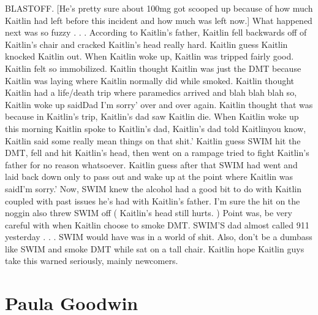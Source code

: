 \documentclass[12pt]{book}
\begin{document}
BLASTOFF. [He's pretty sure about 100mg got scooped up because of how much Kaitlin had left before this incident and how much was left now.] What happened next was so fuzzy . . .  According to Kaitlin's father, Kaitlin fell backwards off of Kaitlin's chair and cracked Kaitlin's head really hard. Kaitlin guess Kaitlin knocked Kaitlin out. When Kaitlin woke up, Kaitlin was tripped fairly good. Kaitlin felt so immobilized. Kaitlin thought Kaitlin was just the DMT because Kaitlin was laying where Kaitlin normally did while smoked. Kaitlin thought Kaitlin had a life/death trip where paramedics arrived and blah blah blah so, Kaitlin woke up saidDad I'm sorry' over and over again. Kaitlin thought that was because in Kaitlin's trip, Kaitlin's dad saw Kaitlin die. When Kaitlin woke up this morning Kaitlin spoke to Kaitlin's dad, Kaitlin's dad told Kaitlinyou know, Kaitlin said some really mean things on that shit.' Kaitlin guess SWIM hit the DMT, fell and hit Kaitlin's head, then went on a rampage tried to fight Kaitlin's father for no reason whatsoever. Kaitlin guess after that SWIM had went and laid back down only to pass out and wake up at the point where Kaitlin was saidI'm sorry.' Now, SWIM knew the alcohol had a good bit to do with Kaitlin coupled with past issues he's had with Kaitlin's father. I'm sure the hit on the noggin also threw SWIM off ( Kaitlin's head still hurts. ) Point was, be very careful with when Kaitlin choose to smoke DMT. SWIM'S dad almost called 911 yesterday . . .  SWIM would have was in a world of shit. Also, don't be a dumbass like SWIM and smoke DMT while sat on a tall chair. Kaitlin hope Kaitlin guys take this warned seriously, mainly newcomers.



\chapter{Paula Goodwin}
\end{document}
